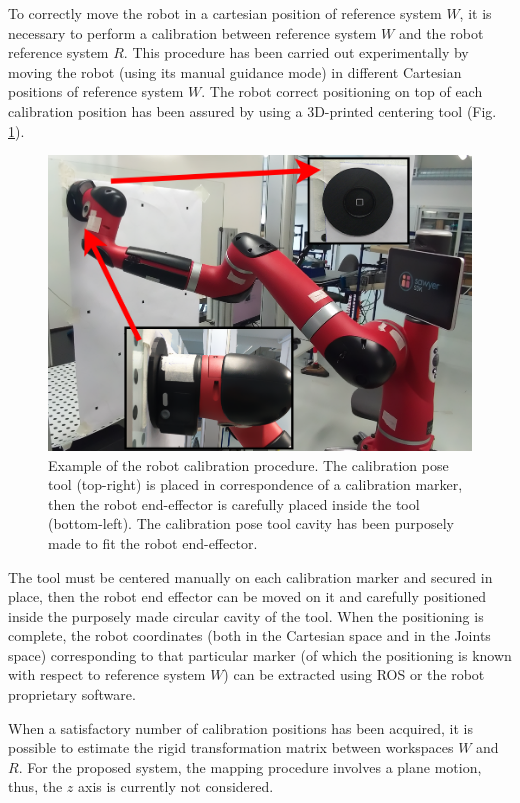 \documentclass[letterpaper, 10 pt, conference]{ieeeconf}  %
\begin{document}
To correctly move the robot in a cartesian position of reference system $W$, it is necessary to perform a calibration between reference system $W$ and the robot reference system $R$. This procedure has been carried out experimentally by moving the robot (using its manual guidance mode) in different Cartesian positions of reference system $W$. The robot correct positioning on top of each calibration position has been assured by using a 3D-printed centering tool (Fig. \ref{fig:robotcalib}). 

\begin{figure}[h]
	\centering
	\includegraphics[width=1\columnwidth]{figures/robotcalibration.png}
	\caption{Example of the robot calibration procedure. The calibration pose tool (top-right) is placed in correspondence of a calibration marker, then the robot end-effector is carefully placed inside the tool (bottom-left). The calibration pose tool cavity has been purposely made to fit the robot end-effector.}
	\label{fig:robotcalib}
\end{figure}

The tool must be centered manually on each calibration marker and secured in place, then the robot end effector can be moved on it and carefully positioned inside the purposely made circular cavity of the tool. When the positioning is complete, the robot coordinates (both in the Cartesian space and in the Joints space) corresponding to that particular marker (of which the positioning is known with respect to reference system $W$) can be extracted using ROS or the robot proprietary software. 

When a satisfactory number of calibration positions has been acquired, it is possible to estimate the rigid transformation matrix between workspaces $W$ and $R$. For the proposed system, the mapping procedure involves a plane motion, thus, the $z$ axis is currently not considered.
\end{document}
